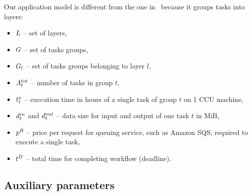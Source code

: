 {  
    Our application model is different from the one in~\cite{Malawski-FGCS-13} because it groups tasks into layers:

    \begin{itemize}
        \item $L$  -- set of layers,
        \item $G$   -- set of tasks groups,
        \item $G_l$ -- set of tasks groups belonging to layer $l$, 
        \item $A^{tot}_t$ -- number of tasks in group $t$,
        \item $t^x_t$ -- execution time in hours of a single task of group $t$ on 1 CCU
        machine,
        \item $d^{in}_t$ and $d^{out}_t$ -- data size for input and
        output of one task $t$ in MiB,
        \item $p^{R}$ -- price per request for queuing service, such as Amazon SQS, required to execute a single task,
        \item $t^D$ -- total time for completing workflow (deadline).
    \end{itemize} 
    
    \subsection{Auxiliary parameters}
    
}
